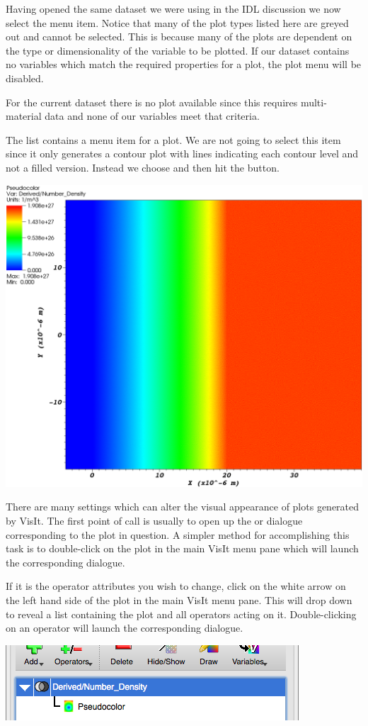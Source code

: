   Having opened the same dataset we were using in the IDL discussion we
  now select the  menu item. Notice that many of the plot
  types listed here are greyed out and cannot be selected. This is because
  many of the plots are dependent on the type or dimensionality of the
  variable to be plotted. If our dataset contains no variables which match
  the required properties for a plot, the plot menu will be disabled.

  For the current dataset there is no  plot available since this
  requires multi-material data and none of our variables meet
  that criteria.

  The list contains a menu item for a  plot. We are not going
  to select this item since it only generates a contour plot with lines
  indicating each contour level and not a filled version. Instead we
  choose  and then hit the  button.
  \begin{center}
    \includegraphics[width=0.8\linewidth]{images/visit_contour}
  \end{center}

  There are many settings which can alter the visual appearance
  of plots generated by VisIt. The first point of call is usually to
  open up the  or  dialogue
  corresponding to the
  plot in question. A simpler method for accomplishing this task is
  to double-click on the plot in the main VisIt menu pane which will
  launch the corresponding  dialogue.

  If it is the operator attributes you wish to change,
  click on the white arrow on the left hand side of the plot in the
  main VisIt menu pane. This will drop down to reveal a list containing
  the plot and all operators acting on it. Double-clicking on an operator
  will launch the corresponding  dialogue.
  \begin{center}
    \includegraphics[width=0.7\linewidth]{images/visit_attrib}
  \end{center}

